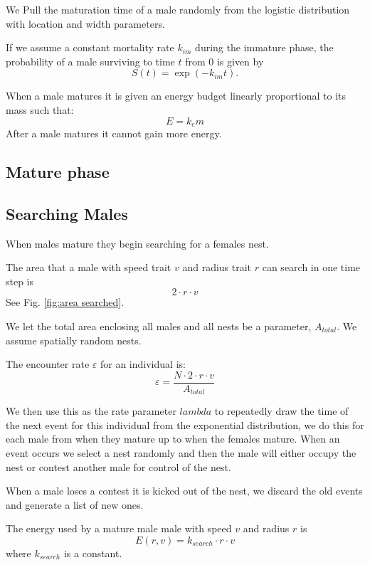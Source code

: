 \documentclass[a4paper,11pt]{article}
\begin{document}
We Pull the maturation time of a male randomly from the logistic distribution with location and width parameters.

If we assume a constant mortality rate $k_{im}$ during the immature phase, the probability of a male surviving to time $t$ from $0$ is given by
\begin{equation} \label{eq:surv_immature}
    S(t) = \exp(-k_{im} t).
\end{equation}

When a male matures it is given an energy budget linearly proportional to its mass such that: 
$$ E = k_em$$
After a male matures it cannot gain more energy.

\subsection{Mature phase}
\subsection{Searching Males}
When males mature they begin searching for a females nest.


The area that a male with speed trait $v$ and radius trait $r$ can search in one time step is
\begin{equation}
    2 \cdot r \cdot v
\end{equation}
See Fig. \ref{fig:area searched}.

We let the total area enclosing all males and all nests be a parameter, $A_{total}$. We assume spatially random nests.

The encounter rate $\varepsilon$ for an individual is:
\begin{equation} \label{eq:encounter rate}
    \varepsilon = \frac {N \cdot 2 \cdot r \cdot v} {A_{total}}
\end{equation}
\citep{Gurarie2012}

We then use this as the rate parameter $lambda$ to repeatedly draw the time of the next event for this individual from the exponential distribution, we do this for each male from when they mature up to when the females mature.
When an event occurs we select a nest randomly and then the male will either occupy the nest or contest another male for control of the nest.

When a male loses a contest it is kicked out of the nest, we discard the old events and generate a list of new ones.

The energy used by a mature male male with speed $v$ and radius $r$ is 
\begin{equation}
    E(r,v) = k_{search} \cdot r \cdot v
\end{equation}
where $k_{search}$ is a constant.
\end{document}
